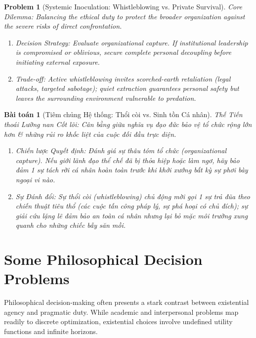 \documentclass{article}
\newtheorem{problem}{Problem}
\newtheorem{baitoan}{Bài toán}
\begin{document}
\begin{problem}[Systemic Inoculation: Whistleblowing vs. Private Survival]
	\emph{Core Dilemma:} Balancing the ethical duty to protect the broader organization against the severe risks of direct confrontation.
	\begin{enumerate}[label=(\roman*)]
		\item \emph{Decision Strategy:} Evaluate organizational capture. If institutional leadership is compromised or oblivious, secure complete personal decoupling before initiating external exposure.
		\item \emph{Trade-off:} Active whistleblowing invites scorched-earth retaliation (legal attacks, targeted sabotage); quiet extraction guarantees personal safety but leaves the surrounding environment vulnerable to predation.
	\end{enumerate}
\end{problem}
\begin{baitoan}[Tiêm chủng Hệ thống: Thổi còi vs. Sinh tồn Cá nhân]
	\emph{Thế Tiến thoái Lưỡng nan Cốt lõi:} Cân bằng giữa nghĩa vụ đạo đức bảo vệ tổ chức rộng lớn hơn \& những rủi ro khốc liệt của cuộc đối đầu trực diện.
	\begin{enumerate}[label=(\roman*)]
		\item \emph{Chiến lược Quyết định:} Đánh giá sự thâu tóm tổ chức (organizational capture). Nếu giới lãnh đạo thể chế đã bị thỏa hiệp hoặc làm ngơ, hãy bảo đảm 1 sự tách rời cá nhân hoàn toàn trước khi khởi xướng bất kỳ sự phơi bày ngoại vi nào.
		\item \emph{Sự Đánh đổi:} Sự thổi còi (whistleblowing) chủ động mời gọi 1 sự trả đũa theo chiến thuật tiêu thổ (các cuộc tấn công pháp lý, sự phá hoại có chủ đích); sự giải cứu lặng lẽ đảm bảo an toàn cá nhân nhưng lại bỏ mặc môi trường xung quanh cho những chiếc bẫy săn mồi.
	\end{enumerate}
\end{baitoan}

\section{Some Philosophical Decision Problems}

Philosophical decision-making often presents a stark contrast between existential agency and pragmatic duty. While academic and interpersonal problems map readily to discrete optimization, existential choices involve undefined utility functions and infinite horizons.
\end{document}
